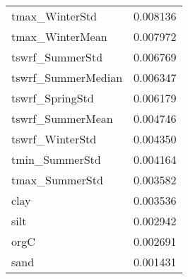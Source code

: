 \begin{tabular}{lr}
tmax_WinterStd & 0.008136 \\
tmax_WinterMean & 0.007972 \\
tswrf_SummerStd & 0.006769 \\
tswrf_SummerMedian & 0.006347 \\
tswrf_SpringStd & 0.006179 \\
tswrf_SummerMean & 0.004746 \\
tswrf_WinterStd & 0.004350 \\
tmin_SummerStd & 0.004164 \\
tmax_SummerStd & 0.003582 \\
clay & 0.003536 \\
silt & 0.002942 \\
orgC & 0.002691 \\
sand & 0.001431 \\
\bottomrule
\end{tabular}
